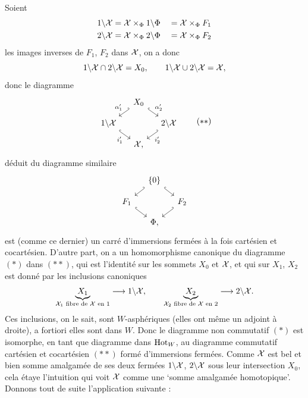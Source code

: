 Soient
\[
\begin{aligned}
1\backslash\mathcal{X} &= \mathcal{X}\times_{\Phi} 1\backslash\Phi &&= \mathcal{X}\times_{\Phi} F_1\\
2\backslash\mathcal{X} &= \mathcal{X}\times_{\Phi} 2\backslash\Phi &&= \mathcal{X}\times_{\Phi} F_2
\end{aligned}
\]
les images inverses de $F_1$, $F_2$ dans $\mathcal{X}$, on a donc
\[
1\backslash\mathcal{X}\cap 2\backslash\mathcal{X} = X_0, \qquad 1\backslash\mathcal{X}\cup 2\backslash\mathcal{X} = \mathcal{X},
\]
donc le diagramme
\[
\begin{tikzcd}[column sep=small, row sep=small, ampersand replacement=\&]
 \& X_0 \arrow[dl, hook', "\alpha'_1"'] \arrow[dr, hook, "\alpha'_2"] \& \\
1\backslash\cX \arrow[dr, hook, "i'_1"'] \& \& 2\backslash\cX \arrow[dl, hook', "i'_2"] \\
 \& \cX, \&
\end{tikzcd}
\tag*{$(**)$}
\]
déduit du diagramme similaire
\[
\begin{tikzcd}[column sep=small, row sep=small, ampersand replacement=\&]
 \& \{0\} \arrow[dl, hook'] \arrow[dr, hook] \& \\
F_1 \arrow[dr, hook] \& \& F_2 \arrow[dl, hook'] \\
 \& \Phi, \&
\end{tikzcd}
\]
est (comme ce dernier) un carré d'immersions fermées à la fois cartésien et cocartésien. D'autre part, on a un homomorphisme
canonique du diagramme $(*)$ dans $(**)$, qui est l'identité sur les sommets $X_0$ et $\mathcal{X}$, et qui sur $X_1$, $X_2$ est donné par les inclusions canoniques
\[
\underbrace{X_1}_{\text{\scriptsize $\mathcal{X}_1$ fibre de $\mathcal{X}$ en 1}} \longrightarrow 1\backslash\mathcal{X}, \qquad
\underbrace{X_2}_{\text{\scriptsize $\mathcal{X}_2$ fibre de $\mathcal{X}$ en 2}} \longrightarrow 2\backslash\mathcal{X}.
\]
Ces inclusions, on le sait, sont $W$-asphériques (elles ont même un adjoint à droite), a fortiori elles sont dans $W$. Donc le diagramme non commutatif $(*)$ est isomorphe, en tant que diagramme dans $\mathrm{Hot}_W$, au diagramme commutatif cartésien et cocartésien $(**)$ formé d'immersions fermées. Comme $\mathcal{X}$ est bel et bien somme amalgamée de ses deux fermées %
$1\backslash\mathcal{X}$, $2\backslash\mathcal{X}$ sous leur intersection $X_0$, cela étaye l'intuition qui voit $\mathcal{X}$ comme une `somme amalgamée homotopique'. Donnons tout de suite l'application suivante :

